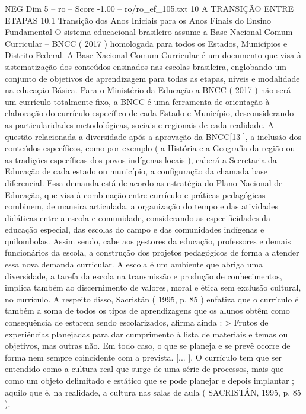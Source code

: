 \begin{textsample}{NEG Dim 5 – ro – Score -1.00 – ro/ro\_ef\_105.txt}  \label{ex:f5_neg_177}
10 A TRANSIÇÃO ENTRE ETAPAS 10.1 Transição dos Anos Iniciais para os Anos Finais do Ensino Fundamental O sistema educacional brasileiro assume a Base Nacional Comum Curricular – BNCC ( 2017 ) homologada para todos os Estados, Municípios e Distrito Federal.
A Base Nacional Comum Curricular é um documento que visa à sistematização dos conteúdos ensinados nas escolas brasileira, englobando um conjunto de objetivos de aprendizagem para todas as etapas, níveis e modalidade na educação Básica.
Para o Ministério da Educação a BNCC ( 2017 ) não será um currículo totalmente fixo, a BNCC é uma ferramenta de orientação à elaboração do currículo específico de cada Estado e Município, desconsiderando as particularidades metodológicas, sociais e regionais de cada realidade.
A questão relacionada a diversidade após a aprovação da BNCC[13 ], a inclusão dos conteúdos específicos, como por exemplo ( a História e a Geografia da região ou as tradições específicas dos povos indígenas locais ), caberá a Secretaria da Educação de cada estado ou município, a configuração da chamada base diferencial.
Essa demanda está de acordo as estratégia do Plano Nacional de Educação, que visa à combinação entre currículo e práticas pedagógicas combinem, de maneira articulada, a organização do tempo e das atividades didáticas entre a escola e comunidade, considerando as especificidades da educação especial, das escolas do campo e das comunidades indígenas e quilombolas.
Assim sendo, cabe aos gestores da educação, professores e demais funcionários da escola, a construção dos projetos pedagógicos de forma a atender essa nova demanda curricular.
A escola é um ambiente que abriga uma diversidade, a tarefa da escola na transmissão e produção de conhecimentos, implica também ao discernimento de valores, moral e ética sem exclusão cultural, no currículo.
A respeito disso, Sacristán ( 1995, p. 85 ) enfatiza que o currículo é também a soma de todos os tipos de aprendizagens que os alunos obtêm como consequência de estarem sendo escolarizados, afirma ainda : > Frutos de experiências planejadas para dar cumprimento à lista de materiais e temas ou objetivos, mas outras não.
Em todo caso, o que se planeja e se prevê ocorre de forma nem sempre coincidente com a prevista. [... ].
O currículo tem que ser entendido como a cultura real que surge de uma série de processos, mais que como um objeto delimitado e estático que se pode planejar e depois implantar ; aquilo que é, na realidade, a cultura nas salas de aula ( SACRISTÁN, 1995, p. 85 ).

\end{textsample}
